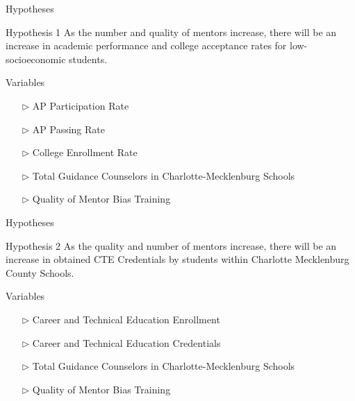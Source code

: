 \documentclass[10pt]{beamer}
\begin{document}
\begin{frame}[fragile]{Hypotheses}
    \fontsize{11pt}{7.2}
    \begin{block}{Hypothesis 1}
        As the number and quality of mentors increase, there will be an increase in academic performance and college acceptance rates for low-socioeconomic students.
    \end{block}

    \pause

    \vspace{.6cm}

    \begin{exampleblock}{Variables}
        \begin{itemize}
            \item[$\triangleright$] AP Participation Rate
            \item[$\triangleright$] AP Passing Rate
            \item[$\triangleright$] College Enrollment Rate 
            \item[$\triangleright$] Total Guidance Counselors in Charlotte-Mecklenburg Schools
            \item[$\triangleright$] Quality of Mentor Bias Training
        \end{itemize}
    \end{exampleblock}

\end{frame}

\begin{frame}[fragile]{Hypotheses}
    \fontsize{11pt}{7.2}
    \begin{block}{Hypothesis 2}
        As the quality and number of mentors increase, there will be an increase in obtained CTE  Credentials by students within Charlotte Mecklenburg County Schools.
    \end{block}

    \pause 

    \vspace{1cm}

    \begin{exampleblock}{Variables}
        \begin{itemize}
            \item[$\triangleright$] Career and Technical Education Enrollment
            \item[$\triangleright$] Career and Technical Education Credentials
            \item[$\triangleright$] Total Guidance Counselors in Charlotte-Mecklenburg Schools
            \item[$\triangleright$] Quality of Mentor Bias Training
        \end{itemize}
    \end{exampleblock}

\end{frame}
\end{document}
